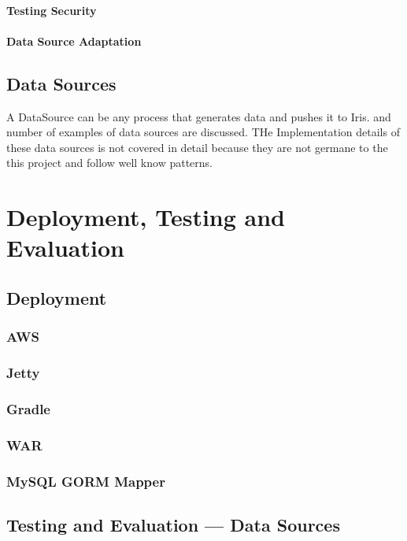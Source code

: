 \documentclass[12pt,a4paper,titlepage]{report}
\begin{document}
\subsubsection{Testing Security}

\subsubsection{Data Source Adaptation}


\section{Data Sources}

A DataSource can be any process that generates data and pushes it to Iris. %
and number of examples of data sources are discussed. THe Implementation details of these data sources is not covered in detail because they are not germane to the this project and follow well know patterns.

\chapter{Deployment, Testing and Evaluation}

\section{Deployment}
\subsection{AWS}
\subsection{Jetty}
\subsection{Gradle}
\subsection{WAR}
\subsection{MySQL GORM Mapper}

\section{Testing and Evaluation --- Data Sources}
\end{document}
